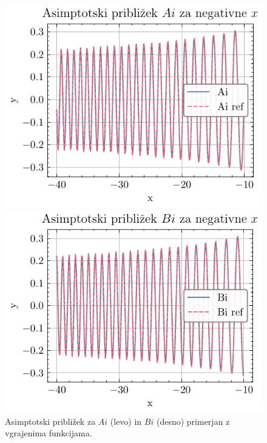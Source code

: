 \documentclass[slovene,11pt,a4paper]{article}
\begin{document}
\begin{figure}[h!]
  \centering
  \begin{minipage}{0.48\textwidth}
    \centering
    \includegraphics[width=\linewidth]{graphs/neg_draw_ai.pdf}
  \end{minipage}\hfill
  \begin{minipage}{0.48\textwidth}
    \centering
    \includegraphics[width=\linewidth]{graphs/neg_draw_bi.pdf}
  \end{minipage}
  \caption{Asimptotski približek za $Ai$ (levo) in $Bi$ (desno) primerjan z vgrajenima funkcijama.}
  \label{fig: neg_draw}
\end{figure}
\end{document}
